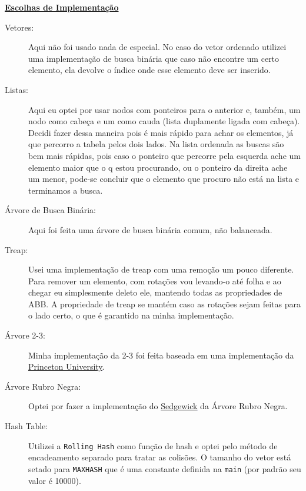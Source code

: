 \documentclass[12pt]{article}
\newcommand{\mytitle}[1]{\textbf{\underline{#1}}}
\begin{document}
\mytitle{Escolhas de Implementação}

\begin{description}
  
\item[Vetores:] Aqui não foi usado nada de especial. No caso do vetor ordenado utilizei uma implementação de busca binária que caso não encontre um certo elemento, ela devolve o índice onde esse elemento deve ser inserido.
  
\item[Listas:] Aqui eu optei por usar nodos com ponteiros para o anterior e, também, um nodo como cabeça e um como cauda (lista duplamente ligada com cabeça). Decidi fazer dessa maneira pois é mais rápido para achar os elementos, já que percorro a tabela pelos dois lados. Na lista ordenada as buscas são bem mais rápidas, pois caso o ponteiro que percorre pela esquerda ache um elemento maior que o q estou procurando, ou o ponteiro da direita ache um menor, pode-se concluir que o elemento que procuro  não está na lista e terminamos a busca.
  
\item[Árvore de Busca Binária:] Aqui foi feita uma árvore de busca binária comum, não balanceada.
  
\item[Treap:] Usei uma implementação de treap com uma remoção um pouco diferente. Para remover um elemento, com rotações vou levando-o até folha e ao chegar eu simplesmente deleto ele, mantendo todas as propriedades de ABB. A propriedade de treap se mantém caso as rotações sejam feitas para o lado certo, o que é garantido na minha implementação.
  
\item[Árvore 2-3:] Minha implementação da 2-3 foi feita baseada em uma implementação da \textcolor{blue}{\underline{\href{https://www.cs.princeton.edu/~dpw/courses/cos326-12/ass/2-3-trees.pdf}{Princeton University}}}.
  
\item[Árvore Rubro Negra:] Optei por fazer a implementação do \textcolor{blue}{\underline{\href{https://algs4.cs.princeton.edu/33balanced/RedBlackBST.java.html}{Sedgewick}}} da Árvore Rubro Negra.
  
\item[Hash Table:] Utilizei a \texttt{Rolling Hash} como função de hash e optei pelo método de encadeamento separado para tratar as colisões. O tamanho do vetor está setado para \texttt{MAXHASH} que é uma constante definida na \texttt{main} (por padrão seu valor é 10000).
  
\end{description}
\end{document}
